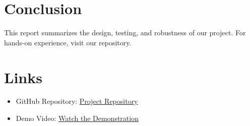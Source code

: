 \documentclass[a4paper,12pt]{article}
\begin{document}
\section{Conclusion}
This report summarizes the design, testing, and robustness of our project. For hands-on experience, visit our repository.

\section{Links}
\begin{itemize}
    \item GitHub Repository: \href{https://github.com/KeshavBansal0122/COP290}{Project Repository}
    \item Demo Video: \href{https://your-video-link.com}{Watch the Demonstration}
\end{itemize}
\end{document}
